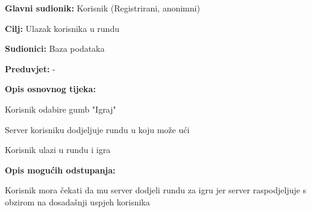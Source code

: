 			    					\noindent {}
			    	\begin{packed_item}
			    		
			    		\item \textbf{Glavni sudionik: } Korisnik (Registrirani, anonimni)
			    		\item  \textbf{Cilj:} Ulazak korisnika u rundu
			    		\item  \textbf{Sudionici:} Baza podataka
			    		\item  \textbf{Preduvjet:} -
			    		\item  \textbf{Opis osnovnog tijeka:}
			    		
			    		\item[] \begin{packed_enum}
			    			
			    			\item Korisnik odabire gumb "Igraj"
			    			\item Server korisniku dodjeljuje rundu u koju može ući
			    			\item Korisnik ulazi u rundu i igra
			    		\end{packed_enum}
			    	
		               \item  \textbf{Opis mogućih odstupanja:}
		    			
		    			\item[] \begin{packed_item}
		    				
		    				\item[2.b] 
		    				\item[] \begin{packed_enum}
		    					
		    					\item Korisnik mora čekati da mu server dodjeli rundu za igru jer server raspodjeljuje s obzirom na dosadašnji uspjeh korisnika 
		    					
		    				\end{packed_enum}
		    				
		    			\end{packed_item}
	    			\end{packed_item}
			    
